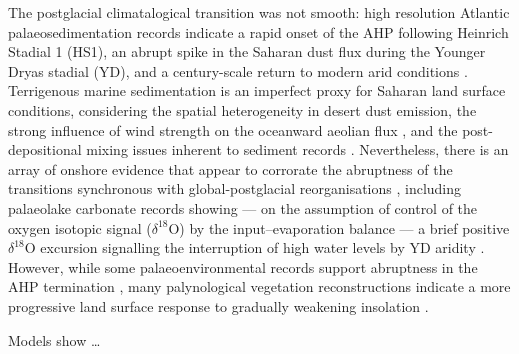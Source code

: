 \documentclass[a4paper]{article}
\newcommand{\delO}{\ensuremath{\delta ^{18}}O}
\begin{document}
The postglacial climatalogical transition was not smooth: high resolution Atlantic palaeosedimentation records indicate a rapid onset of the AHP following Heinrich Stadial 1 (HS1), an abrupt spike in the Saharan dust flux during the Younger Dryas stadial (YD), and a century-scale return to modern arid conditions \parencite{demenocal2000abrupt, kuhlmann2004transition, adkins2006african, mcgee2013magnitude, ehrmann2013dynamics, williams2016glacial}.
Terrigenous marine sedimentation is an imperfect proxy for Saharan land surface conditions, considering the spatial heterogeneity in desert dust emission, the strong influence of wind strength on the oceanward aeolian flux \parencite{ruddiman1997tropical, mcgee2010gustiness, parker2016new}, and the post-depositional mixing issues inherent to sediment records \parencite{mahowald1999dust, giresse2003late, maslin2003evidence}.
Nevertheless, there is an array of onshore evidence that appear to corrorate the abruptness of the transitions synchronous with global-postglacial reorganisations \parencite{}, including palaeolake carbonate records showing --- on the assumption of control of the oxygen isotopic signal (\delO) by the input--evaporation balance --- a brief positive \delO{} excursion signalling the interruption of high water levels by YD aridity \parencite{gasse1990arid}.
However, while some palaeoenvironmental records support abruptness in the AHP termination \parencite{gasse1990arid, salzmann2005dahomey, tierney2017rainfall}, many palynological vegetation reconstructions indicate a more progressive land surface response to gradually weakening insolation \parencite{kropelin2008climate, lezine2009timing, vincens2010vegetation, amaral2013palynological, shanahan2015time}. 

Models show \ldots

\end{document}
